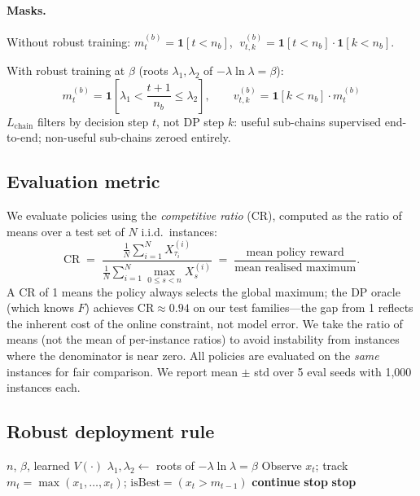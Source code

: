 \documentclass{article}
\begin{document}
\paragraph{Masks.} Without robust training: $m_t^{(b)} = \mathbf{1}[t < n_b]$, $\;v_{t,k}^{(b)} = \mathbf{1}[t < n_b]\cdot\mathbf{1}[k < n_b]$.

With robust training at $\beta$ (roots $\lambda_1, \lambda_2$ of $-\lambda\ln\lambda = \beta$):
\[
m_t^{(b)} = \mathbf{1}\!\left[\lambda_1 < \frac{t{+}1}{n_b} \le \lambda_2\right], \qquad v_{t,k}^{(b)} = \mathbf{1}[k < n_b] \cdot m_t^{(b)}
\]
$L_{\mathrm{chain}}$ filters by decision step $t$, not DP step $k$: useful sub-chains supervised end-to-end; non-useful sub-chains zeroed entirely.

\subsection{Evaluation metric}

We evaluate policies using the \emph{competitive ratio} (CR), computed as the ratio of means over a test set of $N$ i.i.d.\ instances:
\[
  \mathrm{CR} \;=\; \frac{\frac{1}{N}\sum_{i=1}^{N} X^{(i)}_{\tau_i}}{\frac{1}{N}\sum_{i=1}^{N} \max_{0 \le s < n} X^{(i)}_s}
  \;=\; \frac{\text{mean policy reward}}{\text{mean realised maximum}}.
\]
A CR of 1 means the policy always selects the global maximum; the DP oracle (which knows $F$) achieves $\mathrm{CR} \approx 0.94$ on our test families---the gap from 1 reflects the inherent cost of the online constraint, not model error. We take the ratio of means (not the mean of per-instance ratios) to avoid instability from instances where the denominator is near zero. All policies are evaluated on the \emph{same} instances for fair comparison. We report mean $\pm$ std over 5 eval seeds with 1{,}000 instances each.

\subsection{Robust deployment rule}

\begin{algorithm}[h]
\caption{Robust stopping rule}
\label{alg:robust}
\begin{algorithmic}[1]
\Require $n$, $\beta$, learned $V(\cdot)$
\State $\lambda_1, \lambda_2 \gets$ roots of $-\lambda \ln \lambda = \beta$
    \State Observe $x_t$; track $m_t = \max(x_1, \ldots, x_t)$; $\mathrm{isBest} = (x_t > m_{t-1})$
     \textbf{continue} 
         \textbf{stop} 
        \EndIf
    \Else
         \textbf{stop} 
        \EndIf
    \EndIf
\EndFor
\end{algorithmic}
\end{algorithm}
\end{document}
